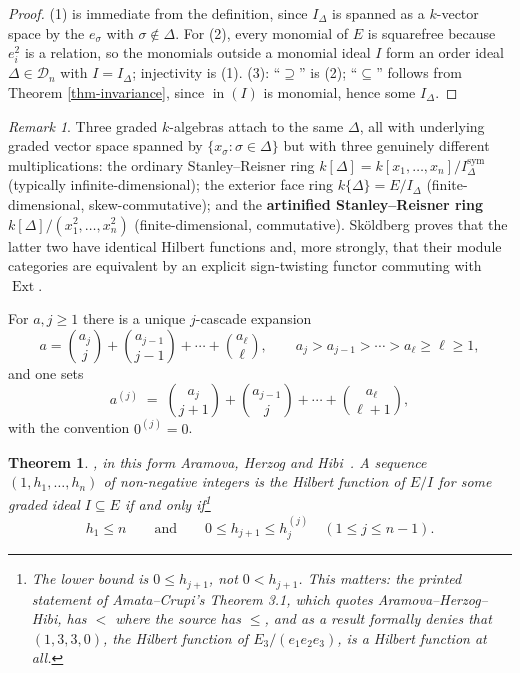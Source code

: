 \documentclass[11pt, a4paper, abstract=yes]{scrartcl}
\theoremstyle{definition}
\theoremstyle{remark}
\newtheorem{remark}[definition]{Remark}
\theoremstyle{plain}
\newtheorem{theorem}[definition]{Theorem}
\newcommand{\leannone}{\tikz[baseline=-0.6ex]\draw[leannone,line width=0.6pt] (0,0) circle (0.55ex);}
\newcommand{\leanmark}[1]{\leavevmode{\reversemarginpar\marginnote{\raggedleft#1}}}
\newcommand{\inn}{\operatorname{in}}
\let\autocite\cite
\begin{document}
\begin{proof}
(1) is immediate from the definition, since \(I_\Delta\) is spanned as a \(k\)-vector space by the
\(e_\sigma\) with \(\sigma\notin\Delta\). For (2), every monomial of \(E\) is squarefree because \(e_i^2\) is a relation, so the monomials outside a monomial ideal \(I\) form an order ideal
\(\Delta\in\mathcal D_n\) with \(I=I_\Delta\); injectivity is (1). (3): ``\(\supseteq\)'' is (2);
``\(\subseteq\)'' follows from Theorem \ref{thm-invariance}, since \(\inn(I)\) is monomial, hence some
\(I_\Delta\).
\end{proof}

\begin{remark}
Three graded \(k\)-algebras attach to the same \(\Delta\), all with underlying graded vector space
spanned by \(\lbrace x_\sigma:\sigma\in\Delta\rbrace\) but with three genuinely different
multiplications: the ordinary Stanley--Reisner ring
\(k[\Delta]=k[x_1,\dots,x_n]/I^{\mathrm{sym}}_\Delta\) (typically infinite-dimensional); the exterior
face ring \(k\lbrace\Delta\rbrace=E/I_\Delta\) (finite-dimensional, skew-commutative); and the
\textbf{artinified Stanley--Reisner ring} \(k[\Delta]/(x_1^2,\dots,x_n^2)\) (finite-dimensional,
commutative). Sköldberg \autocite{Skoldberg1999} proves that the latter two have identical Hilbert functions and, more
strongly, that their module categories are equivalent by an explicit sign-twisting functor commuting
with \(\operatorname{Ext}\).
\label{rem-three-rings}
\end{remark}

For \(a,j\ge1\) there is a unique \(j\)-cascade expansion
\begin{equation}\label{eq:three-rings}
  a=\binom{a_j}{j}+\binom{a_{j-1}}{j-1}+\cdots+\binom{a_\ell}{\ell},
  \qquad a_j>a_{j-1}>\cdots>a_\ell\ge\ell\ge1,
\end{equation}
and one sets
\begin{equation}\label{eq:three-rings-2}
  a^{(j)}\;=\;\binom{a_j}{j+1}+\binom{a_{j-1}}{j}+\cdots+\binom{a_\ell}{\ell+1},
\end{equation}
with the convention \(0^{(j)}=0\).

\begin{theorem}
\leanmark{\leannone}\relax \autocite{ClementsLindstroem1969,Katona1968,Kruskal1963}, in this form
Aramova, Herzog and Hibi~\cite[Theorem 4.1]{AramovaHerzogHibi1997}. A sequence \((1,h_1,\dots,h_n)\) of non-negative integers is the Hilbert function of
\(E/I\) for some graded ideal \(I\subseteq E\) if and only if\footnote{The lower bound is \(0\le h_{j+1}\), not \(0<h_{j+1}\). This matters: the printed statement of Amata--Crupi's Theorem 3.1, which quotes Aramova--Herzog--Hibi, has \(<\) where the source has \(\le\), and as a result formally denies that \((1,3,3,0)\), the Hilbert function of \(E_3/(e_1e_2e_3)\), is a Hilbert function at all.}
\begin{equation}\label{eq:kk}
  h_1\le n \qquad\text{and}\qquad 0\le h_{j+1}\le h_j^{(j)}\quad (1\le j\le n-1).
\end{equation}
\label{thm-kk}
\end{theorem}
\end{document}
